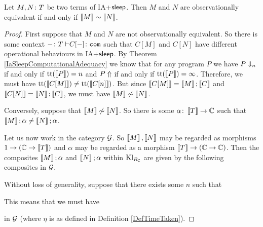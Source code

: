 \documentclass{article}
\begin{document}
\begin{theorem}
  Let $M,N\from T$ be two terms of IA+$\sleep$.  
  Then $M$ and $N$ are observationally equivalent if and only if $\deno{M}\sim\deno{N}$.
  \label{IaSleepTimeComplexity}
\end{theorem}
\begin{proof}
  First suppose that $M$ and $N$ are not observationally equivalent.  
  So there is some context $-\from T\ts C[-]\from\com$ such that $C[M]$ and $C[N]$ have different operational behaviours in IA+$\sleep$.
  By Theorem \ref{IaSleepComputationalAdequacy} we know that for any program $P$ we have $P\converges_n$ if and only if $\tit(\deno P)=n$ and $P\diverges$ if and only if $\tit(\deno P)=\infty$.
  Therefore, we must have $\tit(\deno{C[M]})\ne \tit(\deno{C[n]})$.  
  But since $\deno{C[M]}=\deno{M};\deno{C}$ and $\deno{C[N]}=\deno{N};\deno{C}$, we must have $\deno M\not\sim \deno N$.

  Conversely, suppose that $\deno M \not\sim \deno N$.  
  So there is some $\alpha\from \deno{T} \to \bC$ such that $\deno{M};\alpha\ne\deno{N};\alpha$.

  Let us now work in the category $\G$.  
  So $\deno{M},\deno{N}$ may be regarded as morphisms $1 \to (\bC \to \deno{T})$ and $\alpha$ may be regarded as a morphism $\deno{T} \to (\bC \to \bC)$.
  Then the composites $\deno M;\alpha$ and $\deno N;\alpha$ within $\Kl_{R_\bC}$ are given by the following composites in $\G$.
  Without loss of generality, suppose that there exists some $n$ such that
  This means that we must have
  in $\G$ (where $\eta$ is as defined in Definition \ref{DefTimeTaken}).


\end{proof}
\end{document}
